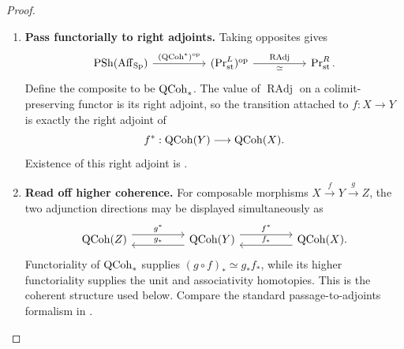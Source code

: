 \begin{proof}
\leavevmode
\begin{enumerate}[label=\textup{(\arabic*)}]
    \item \textbf{Pass functorially to right adjoints.}
    Taking opposites gives
    \[
    \begin{tikzcd}[column sep=huge]
        \PSh(\Aff_{\Sp})
            \arrow[r, "{(\QCoh^*)^{\op}}"]
        &
        (\Pr^L_{\mathrm{st}})^{\op}
            \arrow[r, "{\operatorname{RAdj}}", "\simeq"']
        &
        \Pr^R_{\mathrm{st}}.
    \end{tikzcd}
    \]
    Define the composite to be \(\operatorname{QCoh}_*\). The value of
    \(\operatorname{RAdj}\) on a colimit-preserving functor is its right
    adjoint, so the transition attached to \(f:X\to Y\) is exactly the
    right adjoint of
    \[
        f^*:\operatorname{QCoh}(Y)\longrightarrow\operatorname{QCoh}(X).
    \]
    Existence of this right adjoint is
    .

    \item \textbf{Read off higher coherence.}
    For composable morphisms
    \(X\xrightarrow{f}Y\xrightarrow{g}Z\), the two adjunction directions may
    be displayed simultaneously as
    \[
    \begin{tikzcd}[column sep=huge, row sep=large]
        \QCoh(Z)
            \arrow[r, "g^*", shift left=1.1ex]
        &
        \QCoh(Y)
            \arrow[l, swap, "g_*", shift left=1.1ex]
            \arrow[r, "f^*", shift left=1.1ex]
        &
        \QCoh(X)
            \arrow[l, swap, "f_*", shift left=1.1ex].
    \end{tikzcd}
    \]
    Functoriality of \(\operatorname{QCoh}_*\) supplies
    \((g\circ f)_*\simeq g_*f_*\), while its higher functoriality supplies
    the unit and associativity homotopies. This is the coherent structure
    used below. Compare the standard passage-to-adjoints formalism in
    \cite{LurieHigherAlgebra}.
\end{enumerate}
\end{proof}

